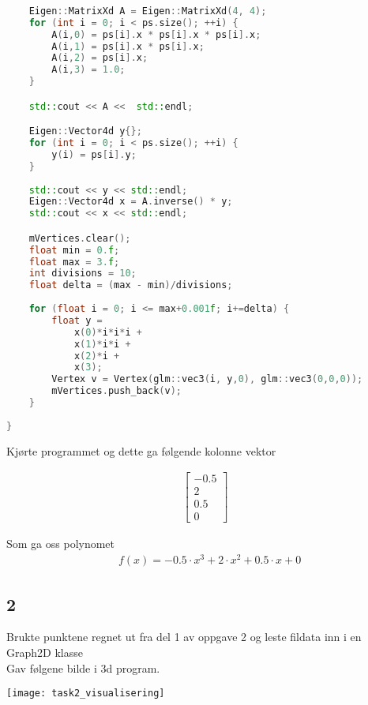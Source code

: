 ﻿\documentclass[14]{article}
\begin{document}
\begin{flushleft}
\begin{lstlisting}[language=C++, caption=Oppgave 2 numerisk utregning]
        
    Eigen::MatrixXd A = Eigen::MatrixXd(4, 4);
    for (int i = 0; i < ps.size(); ++i) {
        A(i,0) = ps[i].x * ps[i].x * ps[i].x;
        A(i,1) = ps[i].x * ps[i].x;
        A(i,2) = ps[i].x;
        A(i,3) = 1.0;
    }

    std::cout << A <<  std::endl;

    Eigen::Vector4d y{};
    for (int i = 0; i < ps.size(); ++i) {
        y(i) = ps[i].y;
    }
        
    std::cout << y << std::endl;
    Eigen::Vector4d x = A.inverse() * y;
    std::cout << x << std::endl;

    mVertices.clear();
    float min = 0.f;
    float max = 3.f;
    int divisions = 10;
    float delta = (max - min)/divisions;
    
    for (float i = 0; i <= max+0.001f; i+=delta) {
        float y =
            x(0)*i*i*i +
            x(1)*i*i +
            x(2)*i +
            x(3);
        Vertex v = Vertex(glm::vec3(i, y,0), glm::vec3(0,0,0));
        mVertices.push_back(v);    
    }
    
}
        \end{lstlisting}
        
        Kjørte programmet og dette ga følgende kolonne vektor
        
        \begin{align*}
            \begin{bmatrix}
                -0.5 \\ 2 \\ 0.5 \\ 0
            \end{bmatrix}
            \end{align*}
        
        Som ga oss polynomet 
        \begin{align*}
            & f(x) = -0.5 \cdot x^3 + 2 \cdot x^2 + 0.5 \cdot x + 0
        \end{align*}

        \subsection*{2}
        
        Brukte punktene regnet ut fra del 1 av oppgave 2 og leste fildata inn i en Graph2D klasse\\
        Gav følgene bilde i 3d program.
        
        \texttt{[image: task2\_visualisering]}
        


\end{flushleft}
\end{document}
